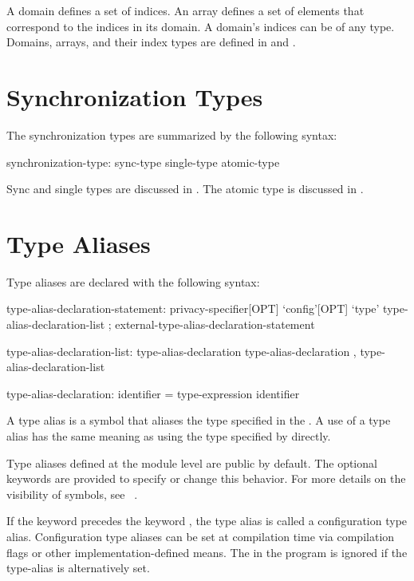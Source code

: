 A domain defines a set of indices. An array defines a set of
elements that correspond to the indices in its domain.
A domain's indices can be of any type.
Domains, arrays, and their index
types are defined in  and .

\section{Synchronization Types}
\label{Synchronization_Types}

The synchronization types are summarized by the following syntax:

\begin{syntax}
synchronization-type:
  sync-type
  single-type
  atomic-type
\end{syntax}

Sync and single types are discussed in .
The atomic type is discussed in .

\clearpage
\section{Type Aliases}
\label{Type_Aliases}

Type aliases are declared with the following syntax:
\begin{syntax}
type-alias-declaration-statement:
  privacy-specifier[OPT] `config'[OPT] `type' type-alias-declaration-list ;
  external-type-alias-declaration-statement

type-alias-declaration-list:
  type-alias-declaration
  type-alias-declaration , type-alias-declaration-list

type-alias-declaration:
  identifier = type-expression
  identifier
\end{syntax}
A type alias is a symbol that aliases the type specified in the
.  A use of a type alias has the same meaning as using
the type specified by  directly.

Type aliases defined at the module level are public by default.  The
optional  keywords are provided to specify or
change this behavior.  For more details on the visibility of symbols,
see ~.

If the keyword  precedes the keyword , the
type alias is called a configuration type alias.  Configuration type
aliases can be set at compilation time via compilation flags or other
implementation-defined means.  The  in the
program is ignored if the type-alias is alternatively set.

